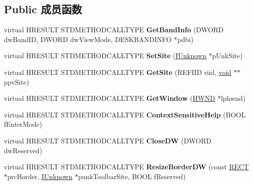 \subsection*{Public 成员函数}
\begin{DoxyCompactItemize}
\item 
\mbox{\label{class_c_address_band_a1defeba2a1a0483b9753b8c021777cec}} 
virtual H\+R\+E\+S\+U\+LT S\+T\+D\+M\+E\+T\+H\+O\+D\+C\+A\+L\+L\+T\+Y\+PE {\bfseries Get\+Band\+Info} (D\+W\+O\+RD dw\+Band\+ID, D\+W\+O\+RD dw\+View\+Mode, D\+E\+S\+K\+B\+A\+N\+D\+I\+N\+FO $\ast$pdbi)
\item 
\mbox{\label{class_c_address_band_a1217691011c5b5a7a75c4fb0a1b5b662}} 
virtual H\+R\+E\+S\+U\+LT S\+T\+D\+M\+E\+T\+H\+O\+D\+C\+A\+L\+L\+T\+Y\+PE {\bfseries Set\+Site} (\hyperlink{interface_i_unknown}{I\+Unknown} $\ast$p\+Unk\+Site)
\item 
\mbox{\label{class_c_address_band_a8f7f45a6898adad5b404215b31929ada}} 
virtual H\+R\+E\+S\+U\+LT S\+T\+D\+M\+E\+T\+H\+O\+D\+C\+A\+L\+L\+T\+Y\+PE {\bfseries Get\+Site} (R\+E\+F\+I\+ID riid, \hyperlink{interfacevoid}{void} $\ast$$\ast$ppv\+Site)
\item 
\mbox{\label{class_c_address_band_a00eb9aae73b1651acbf9cf9be443a870}} 
virtual H\+R\+E\+S\+U\+LT S\+T\+D\+M\+E\+T\+H\+O\+D\+C\+A\+L\+L\+T\+Y\+PE {\bfseries Get\+Window} (\hyperlink{interfacevoid}{H\+W\+ND} $\ast$lphwnd)
\item 
\mbox{\label{class_c_address_band_abd90d2d7d7b71574bbac3c1a93eeb10c}} 
virtual H\+R\+E\+S\+U\+LT S\+T\+D\+M\+E\+T\+H\+O\+D\+C\+A\+L\+L\+T\+Y\+PE {\bfseries Context\+Sensitive\+Help} (B\+O\+OL f\+Enter\+Mode)
\item 
\mbox{\label{class_c_address_band_a2197bc814f64a0a39ce86bd6c6ddce7e}} 
virtual H\+R\+E\+S\+U\+LT S\+T\+D\+M\+E\+T\+H\+O\+D\+C\+A\+L\+L\+T\+Y\+PE {\bfseries Close\+DW} (D\+W\+O\+RD dw\+Reserved)
\item 
\mbox{\label{class_c_address_band_ad4867f8b92b8adc3626291d56e15eebc}} 
virtual H\+R\+E\+S\+U\+LT S\+T\+D\+M\+E\+T\+H\+O\+D\+C\+A\+L\+L\+T\+Y\+PE {\bfseries Resize\+Border\+DW} (const \hyperlink{structtag_r_e_c_t}{R\+E\+CT} $\ast$prc\+Border, \hyperlink{interface_i_unknown}{I\+Unknown} $\ast$punk\+Toolbar\+Site, B\+O\+OL f\+Reserved)
$$
\end{DoxyCompactItemize}
